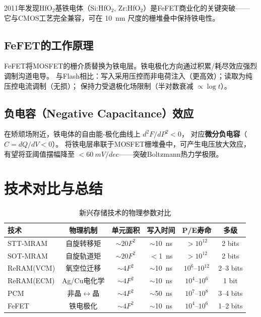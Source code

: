 \documentclass[11pt,a4paper,twoside]{article}
\theoremstyle{definition}\newtheorem{definition}{定义}[section]
\theoremstyle{plain}\newtheorem{theorem}{定理}[section]
\theoremstyle{remark}\newtheorem{remark}{注解}[section]
\begin{document}
2011年发现HfO$_2$基铁电体（Si:HfO$_2$, Zr:HfO$_2$）是FeFET商业化的关键突破——
它与CMOS工艺完全兼容，可在 \SI{10}{nm} 尺度的栅堆叠中保持铁电性。

\subsection{FeFET的工作原理}

FeFET将MOSFET的栅介质替换为铁电层。铁电极化方向通过积累/耗尽效应强烈调制沟道电导。
与Flash相比：写入采用压控而非电荷注入（更高效）；读取为纯压控电流调制（无损）；
保持力受退极化场限制（半对数衰减 $\propto \log t$）。

\subsection{负电容（Negative Capacitance）效应}

在矫顽场附近，铁电体的自由能-极化曲线上 $d^2 F/dP^2 < 0$，
对应\textbf{微分负电容}（$C = dQ/dV < 0$）。
将铁电层串联于MOSFET栅堆叠中，可产生电压放大效应，
有望将亚阈值摆幅降至 $< \SI{60}{mV/dec}$——突破Boltzmann热力学极限。

\section{技术对比与总结}

\begin{table}[H]
\centering\caption{新兴存储技术的物理参数对比}
\begin{tabular}{@{}lccccc@{}}
\toprule
技术 & 物理机制 & 单元面积 & 写入时间 & P/E寿命 & 多级 \\
\midrule
STT-MRAM & 自旋转移矩 & $\sim 20F^2$ & $\sim$\SI{10}{ns} & $>10^{12}$ & 2 bits \\
SOT-MRAM & 自旋轨道矩 & $\sim 20F^2$ & $<$\SI{1}{ns} & $>10^{12}$ & 2 bits \\
ReRAM(VCM) & 氧空位迁移 & $\sim 4F^2$ & $\sim$\SI{10}{ns} & $10^6$--$10^{12}$ & 2--3 bits \\
ReRAM(ECM) & Ag/Cu电化学 & $\sim 4F^2$ & $\sim$\SI{10}{ns} & $10^4$--$10^6$ & 1 bit \\
PCM & 非晶$\leftrightarrow$晶 & $\sim 4F^2$ & $\sim$\SI{50}{ns} & $10^7$--$10^8$ & 3--4 bits \\
FeFET & 铁电极化 & $\sim 4F^2$ & $\sim$\SI{10}{ns} & $10^4$--$10^6$ & 1--2 bits \\
\bottomrule
\end{tabular}
\end{table}
\end{document}
